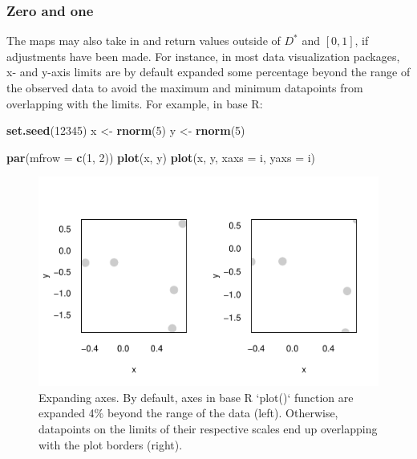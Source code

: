\documentclass[
]{book}
\newenvironment{Shaded}{\begin{snugshade}}{\end{snugshade}}
\newcommand{\AttributeTok}[1]{\textcolor[rgb]{0.13,0.29,0.53}{#1}}
\newcommand{\DecValTok}[1]{\textcolor[rgb]{0.00,0.00,0.81}{#1}}
\newcommand{\FunctionTok}[1]{\textcolor[rgb]{0.13,0.29,0.53}{\textbf{#1}}}
\newcommand{\NormalTok}[1]{#1}
\newcommand{\OtherTok}[1]{\textcolor[rgb]{0.56,0.35,0.01}{#1}}
\newcommand{\StringTok}[1]{\textcolor[rgb]{0.31,0.60,0.02}{#1}}
\theoremstyle{definition}
\theoremstyle{definition}
\theoremstyle{definition}
\theoremstyle{definition}
\theoremstyle{remark}
\begin{document}
\subsubsection{Zero and one}\label{zero-and-one}

The maps may also take in and return values outside of \(D^*\) and \([0, 1]\), if adjustments have been made. For instance, in most data visualization packages, x- and y-axis limits are by default expanded some percentage beyond the range of the observed data to avoid the maximum and minimum datapoints from overlapping with the limits. For example, in base R:

\begin{Shaded}
\begin{Highlighting}[]
\FunctionTok{set.seed}\NormalTok{(}\DecValTok{12345}\NormalTok{)}
\NormalTok{x }\OtherTok{\textless{}{-}} \FunctionTok{rnorm}\NormalTok{(}\DecValTok{5}\NormalTok{)}
\NormalTok{y }\OtherTok{\textless{}{-}} \FunctionTok{rnorm}\NormalTok{(}\DecValTok{5}\NormalTok{)}

\FunctionTok{par}\NormalTok{(}\AttributeTok{mfrow =} \FunctionTok{c}\NormalTok{(}\DecValTok{1}\NormalTok{, }\DecValTok{2}\NormalTok{))}
\FunctionTok{plot}\NormalTok{(x, y) }
\FunctionTok{plot}\NormalTok{(x, y, }\AttributeTok{xaxs =} \StringTok{\textquotesingle{}i\textquotesingle{}}\NormalTok{, }\AttributeTok{yaxs =} \StringTok{\textquotesingle{}i\textquotesingle{}}\NormalTok{) }
\end{Highlighting}
\end{Shaded}

\begin{figure}

{\centering \includegraphics{_main_files/figure-latex/unnamed-chunk-17-1} 

}

\caption{Expanding axes. By default, axes in base R `plot()` function are expanded 4\% beyond the range of the data (left). Otherwise, datapoints on the limits of their respective scales end up overlapping with the plot borders (right).}\label{fig:unnamed-chunk-17}
\end{figure}
\end{document}
